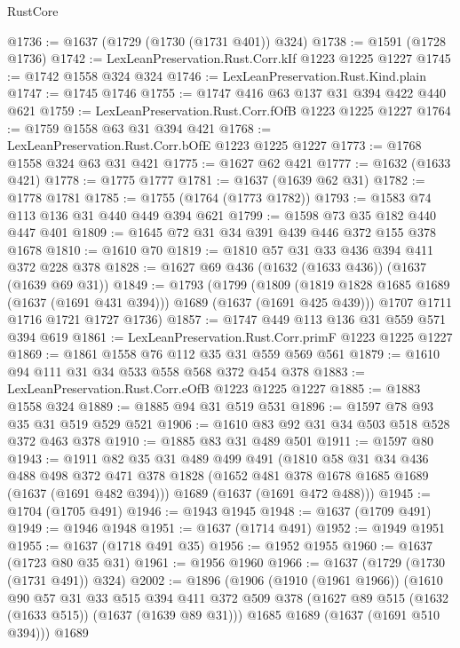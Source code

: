 \begin{lexlean}{RustCore}
\begin{coremodule}
@1736 := @1637 (@1729 (@1730 (@1731 @401)) @324)
@1738 := @1591 (@1728 @1736)
@1742 := LexLeanPreservation.Rust.Corr.kIf @1223 @1225 @1227
@1745 := @1742 @1558 @324 @324
@1746 := LexLeanPreservation.Rust.Kind.plain
@1747 := @1745 @1746
@1755 := @1747 @416 @63 @137 @31 @394 @422 @440 @621
@1759 := LexLeanPreservation.Rust.Corr.fOfB @1223 @1225 @1227
@1764 := @1759 @1558 @63 @31 @394 @421
@1768 := LexLeanPreservation.Rust.Corr.bOfE @1223 @1225 @1227
@1773 := @1768 @1558 @324 @63 @31 @421
@1775 := @1627 @62 @421
@1777 := @1632 (@1633 @421)
@1778 := @1775 @1777
@1781 := @1637 (@1639 @62 @31)
@1782 := @1778 @1781
@1785 := @1755 (@1764 (@1773 @1782))
@1793 := @1583 @74 @113 @136 @31 @440 @449 @394 @621
@1799 := @1598 @73 @35 @182 @440 @447 @401
@1809 := @1645 @72 @31 @34 @391 @439 @446 @372 @155 @378 @1678
@1810 := @1610 @70
@1819 := @1810 @57 @31 @33 @436 @394 @411 @372 @228 @378
@1828 := @1627 @69 @436 (@1632 (@1633 @436)) (@1637 (@1639 @69 @31))
@1849 := @1793
    (@1799
      (@1809 (@1819 @1828 @1685 @1689 (@1637 (@1691 @431 @394))) @1689 (@1637 (@1691 @425 @439)))
      @1707
      @1711
      @1716
      @1721
      @1727
      @1736)
@1857 := @1747 @449 @113 @136 @31 @559 @571 @394 @619
@1861 := LexLeanPreservation.Rust.Corr.primF @1223 @1225 @1227
@1869 := @1861 @1558 @76 @112 @35 @31 @559 @569 @561
@1879 := @1610 @94 @111 @31 @34 @533 @558 @568 @372 @454 @378
@1883 := LexLeanPreservation.Rust.Corr.eOfB @1223 @1225 @1227
@1885 := @1883 @1558 @324
@1889 := @1885 @94 @31 @519 @531
@1896 := @1597 @78 @93 @35 @31 @519 @529 @521
@1906 := @1610 @83 @92 @31 @34 @503 @518 @528 @372 @463 @378
@1910 := @1885 @83 @31 @489 @501
@1911 := @1597 @80
@1943 := @1911
    @82
    @35
    @31
    @489
    @499
    @491
    (@1810
      @58
      @31
      @34
      @436
      @488
      @498
      @372
      @471
      @378
      @1828
      (@1652 @481 @378 @1678 @1685 @1689 (@1637 (@1691 @482 @394)))
      @1689
      (@1637 (@1691 @472 @488)))
@1945 := @1704 (@1705 @491)
@1946 := @1943 @1945
@1948 := @1637 (@1709 @491)
@1949 := @1946 @1948
@1951 := @1637 (@1714 @491)
@1952 := @1949 @1951
@1955 := @1637 (@1718 @491 @35)
@1956 := @1952 @1955
@1960 := @1637 (@1723 @80 @35 @31)
@1961 := @1956 @1960
@1966 := @1637 (@1729 (@1730 (@1731 @491)) @324)
@2002 := @1896
    (@1906
      (@1910 (@1961 @1966))
      (@1610
        @90
        @57
        @31
        @33
        @515
        @394
        @411
        @372
        @509
        @378
        (@1627 @89 @515 (@1632 (@1633 @515)) (@1637 (@1639 @89 @31)))
        @1685
        @1689
        (@1637 (@1691 @510 @394)))
      @1689

\end{coremodule}
\end{lexlean}
